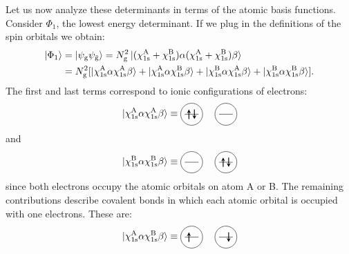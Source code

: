 \documentclass[../Main/chem532-notes.tex]{subfiles}
\begin{document}
Let us now analyze these determinants in terms of the atomic basis functions.
Consider $\Phi_1$, the lowest energy determinant.
If we plug in the definitions of the spin orbitals we obtain:
\begin{equation}
\begin{split}
\ket{\Phi_1} &= \ket{\psi_{\mathrm{g}} \psi_{\bar{\mathrm{g}}}} = N_{\mathrm{g}}^2 \ket{ (\chi_{1\rm s}^{\rm A} + \chi_{1\rm s}^{\rm B}) \alpha  (\chi_{1\rm s}^{\rm A} + \chi_{1\rm s}^{\rm B}) \beta} \\
&= N_{\mathrm{g}}^2 [ \ket{\chi_{1\rm s}^{\rm A}\alpha \chi_{1\rm s}^{\rm A}\beta}
+ \ket{\chi_{1\rm s}^{\rm A}\alpha \chi_{1\rm s}^{\rm B}\beta}
+ \ket{\chi_{1\rm s}^{\rm B}\alpha \chi_{1\rm s}^{\rm A}\beta} 
+\ket{\chi_{1\rm s}^{\rm B}\alpha \chi_{1\rm s}^{\rm B}\beta}].
\end{split}
\end{equation}
The first and last terms correspond to ionic configurations of electrons: 
\begin{equation}
 \ket{\chi_{1\rm s}^{\rm A}\alpha \chi_{1\rm s}^{\rm A}\beta} \equiv 
 \begin{tikzpicture}[baseline={([yshift=-.5ex]current bounding box.center)},vertex/.style={anchor=base, minimum size=18pt, inner sep=2pt}]
    \draw (0.25,0.5) circle (0.4);
    \draw (0,0.5) -- (0.5,0.5);
    \draw[thick,->,>=stealth] (0.15,0.325) -- (0.15,0.675);
    \draw[thick,<-,>=stealth] (0.35,0.325) -- (0.35,0.675);    
    \draw (1.5,0.5) circle (0.4);
    \draw (1.25,0.5) -- (1.75,0.5);
  \end{tikzpicture}
\end{equation}
and
\begin{equation}
 \ket{\chi_{1\rm s}^{\rm B}\alpha \chi_{1\rm s}^{\rm B}\beta} \equiv 
 \begin{tikzpicture}[baseline={([yshift=-.5ex]current bounding box.center)},vertex/.style={anchor=base, minimum size=18pt, inner sep=2pt}]
    \draw (0.25,0.5) circle (0.4);
    \draw (0,0.5) -- (0.5,0.5);
    \draw[thick,->,>=stealth] (1.4,0.325) -- (1.4,0.675);
    \draw (1.5,0.5) circle (0.4);
    \draw (1.25,0.5) -- (1.75,0.5);
    \draw[thick,<-,>=stealth] (1.6,0.325) -- (1.6,0.675);
  \end{tikzpicture}
\end{equation}
since both electrons occupy the atomic orbitals on atom A or B.
The remaining contributions describe covalent bonds in which each atomic orbital is occupied with one electrons. These are:
\begin{equation}
 \ket{\chi_{1\rm s}^{\rm A}\alpha \chi_{1\rm s}^{\rm B}\beta} \equiv 
 \begin{tikzpicture}[baseline={([yshift=-.5ex]current bounding box.center)},vertex/.style={anchor=base, minimum size=18pt, inner sep=2pt}]
    \draw (0.25,0.5) circle (0.4);
    \draw (0,0.5) -- (0.5,0.5);
    \draw[thick,->,>=stealth] (0.15,0.325) -- (0.15,0.675);
    \draw[thick,<-,>=stealth] (1.6,0.325) -- (1.6,0.675);
    \draw (1.5,0.5) circle (0.4);
    \draw (1.25,0.5) -- (1.75,0.5);
  \end{tikzpicture}
\end{equation}
\end{document}
